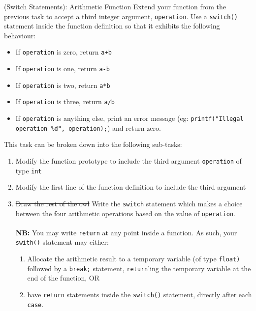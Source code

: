 \documentclass{lab}
\begin{document}
\begin{task}{(Switch Statements): Arithmetic Function}{}
Extend your function from the previous task to accept a third integer argument, \texttt{operation}. Use a \texttt{switch()} statement inside the function definition so that it exhibits the following behaviour:
\\
\begin{itemize}
\item If \texttt{operation} is zero, return \texttt{a+b}
\item If \texttt{operation} is one, return \texttt{a-b}
\item If \texttt{operation} is two, return \texttt{a*b}
\item If \texttt{operation} is three, return \texttt{a/b}
\item If \texttt{operation} is anything else, print an error message (eg: \texttt{printf("Illegal operation \%d", operation);}) and return zero.
\end{itemize}
This task can be broken down into the following sub-tasks:
\begin{enumerate}
\item Modify the function prototype to include the third argument \texttt{operation} of type \texttt{int}
\item Modify the first line of the function definition to include the third argument
\item \st{Draw the rest of the owl} Write the \texttt{switch} statement which makes a choice between the four arithmetic operations based on the value of \texttt{operation}.\\~\\ \textbf{NB:} You may write \texttt{return} at any point inside a function. As such, your \texttt{swith()} statement may either:
\begin{enumerate}
\item Allocate the arithmetic result to a temporary variable (of type \texttt{float)} followed by a \texttt{break;} statement, \texttt{return}'ing the temporary variable at the end of the function, OR
\item have \texttt{return} statements inside the \texttt{switch()} statement, directly after each \texttt{case}.
\end{enumerate}
\end{enumerate}
\end{task}
\end{document}
